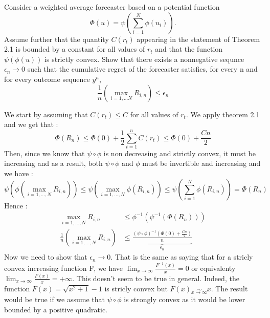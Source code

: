 \begin{exercise}[]{}
	Consider a weighted average forecaster based on a potential function
\begin{equation*}
	\Phi(u) = \psi \left( \sum_{i=1}^{N} \phi(u_i) \right).
\end{equation*}
Assume further that the quantity $ C(r_t) $ appearing in the statement of Theorem 2.1 is bounded by a constant for all values of $ r_t $ and that the function $ \psi(\phi(u)) $ is strictly convex. Show that there exists a nonnegative sequnce $ \epsilon_n \rightarrow 0 $ such that the cumulative regret of the forecaster satisfies, for every n and for every outcome sequence $ y^{n} $,
\begin{equation*}
	\frac{1}{n}\left( \max_{i=1, \ldots N}R_{i,n} \right) \leq \epsilon_n
\end{equation*}

\end{exercise}

\begin{solution}[]
We start by assuming that $ C(r_t) \leq C $ for all values of $ r_t $. We apply theorem 2.1 and we get that :
\begin{equation*}
	\Phi(R_n) \leq \Phi(0) + \frac{1}{2}\sum_{t=1}^{n}C(r_t) \leq \Phi(0) + \frac{Cn}{2}
\end{equation*}
Then, since we know that $ \psi\circ \phi $ is non decreasing and strictly convex, it must be increasing and as a result, both $ \psi \circ \phi $ and $ \phi $ must be invertible and increasing and we have : 
\begin{equation*}
	\psi \left( \phi \left( \max_{i=1,\ldots,N} R_{i,n} \right) \right) \leq \psi \left( \max_{i=1,\ldots,N} \phi(R_{i,n}) \right) \leq \psi\left(\sum_{i=1}^{N} \phi(R_{i,n})\right) = \Phi(R_n)
\end{equation*}
Hence :
\begin{align*}
	\max_{i=1,\ldots,N}R_{i,n} &\leq \phi^{-1}(\psi^{-1}(\Phi(R_n)))\\
	\frac{1}{n} \left( \max_{i=1,\ldots,N}R_{i,n} \right)				   &\leq \underbrace{\frac{(\psi\circ \phi)^{-1}\left(\Phi(0) + \frac{Cn}{2}\right)}{n}}_{\epsilon_n}
\end{align*}
Now we need to show that $ \epsilon_n \rightarrow 0 $. That is the same as saying that for a stricly convex increasing function F, we have $ \lim_{x\rightarrow \infty}\frac{F^{-1}(x)}{x} = 0 $ or equivalenty $  \lim_{x\rightarrow \infty}\frac{F(x)}{x} = + \infty  $. This doesn't seem to be true in general. Indeed, the function $ F(x) = \sqrt{x^{2}+1}-1 $ is stricly convex but $ F(x) \underset{x\rightarrow \infty}{\sim} x $. The result would be true if we assume that $ \psi \circ \phi $ is strongly convex as it would be lower bounded by a positive quadratic.


\end{solution}
